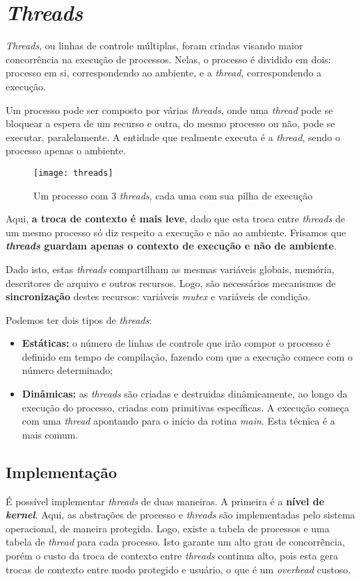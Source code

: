 \section{\textit{Threads}}
\textit{Threads}, ou linhas de controle múltiplas, foram criadas visando maior concorrência na execução de processos. Nelas, o processo é dividido em dois: processo em si, correspondendo ao ambiente, e a \textit{thread}, correspondendo a execução.

Um processo pode ser composto por várias \textit{threads}, onde uma \textit{thread} pode se bloquear a espera de um recurso e outra, do mesmo processo ou não, pode se executar, paralelamente. A entidade que realmente executa é a \textit{thread}, sendo o processo apenas o ambiente.

\begin{figure}
  \texttt{[image: threads]}
  \caption{Um processo com 3 \textit{threads}, cada uma com sua pilha de execução}
  \label{fig:threads}
\end{figure}

Aqui, \textbf{a troca de contexto é mais leve}, dado que esta troca entre \textit{threads} de um mesmo processo só diz respeito a execução e não ao ambiente. Frisamos que \textbf{\textit{threads} guardam apenas o contexto de execução e não de ambiente}.

Dado isto, estas \textit{threads} compartilham as mesmas variáveis globais, memória, descritores de arquivo e outros recursos. Logo, são necessários mecanismos de \textbf{sincronização} destes recursos: variáveis \textit{mutex} e variáveis de condição.

Podemos ter dois tipos de \textit{threads}:
\begin{itemize}
  \item \textbf{Estáticas:} o número de linhas de controle que irão compor o processo é definido em tempo de compilação, fazendo com que a execução comece com o número determinado;

  \item \textbf{Dinâmicas:} as \textit{threads} são criadas e destruidas dinâmicamente, ao longo da execução do processo, criadas com primitivas específicas. A execução começa com uma \textit{thread} apontando para o início da rotina \textit{main}. Esta técnica é a mais comum.
\end{itemize}






\subsection{Implementação}
É possível implementar \textit{threads} de duas maneiras. A primeira é a \textbf{nível de \textit{kernel}}. Aqui, as abstrações de processo e \textit{threads} são implementadas pelo sistema operacional, de maneira protegida. Logo, existe a tabela de processos e uma tabela de \textit{thread} para cada processo. Isto garante um alto grau de concorrência, porém o custo da troca de contexto entre \textit{threads} continua alto, pois esta gera trocas de contexto entre modo protegido e usuário, o que é um \textit{overhead} custoso.

